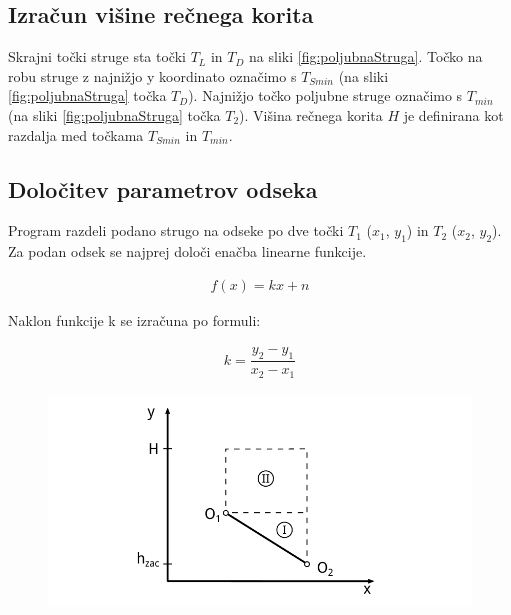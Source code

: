 \subsection{Izračun višine rečnega korita}
Skrajni točki struge sta točki $T_L$ in $T_D$ na sliki \ref{fig:poljubnaStruga}. Točko na robu struge z najnižjo y koordinato označimo s $T_{Smin}$ (na sliki \ref{fig:poljubnaStruga} točka $T_D$). Najnižjo točko poljubne struge označimo s $T_{min}$ (na sliki \ref{fig:poljubnaStruga} točka $T_2$). Višina rečnega korita $H$ je definirana kot razdalja med točkama $T_{Smin}$ in $T_{min}$.




\subsection{Določitev parametrov odseka}

Program razdeli podano strugo na odseke po dve točki $T_1$ ($x_1$, $y_1$) in $T_2$ ($x_2$, $y_2$). Za podan odsek se najprej določi enačba linearne funkcije. 

\begin{ceqn}
\begin{align}
f(x) = kx + n \label{eq:enacba_linearnafunkcija}
\end{align}
\end{ceqn}

Naklon funkcije k se izračuna po formuli: 

\begin{ceqn}
\begin{align}
k = \dfrac{y_2 - y_1}{x_2 - x_1}
\end{align}
\end{ceqn}



\begin{figure}[ht]
	\begin{centering}
		\includegraphics{slike/customChannel/odsek.pdf}
	\end{centering}
\end{figure}




